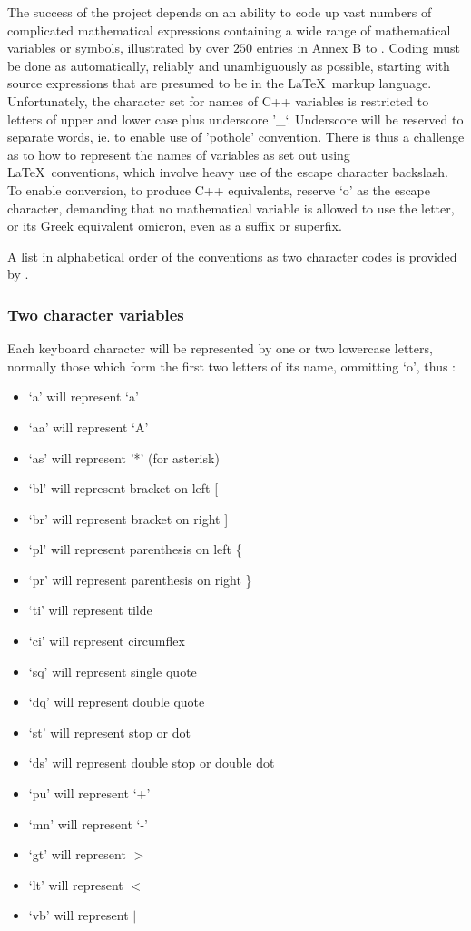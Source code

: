 The success of the project depends on an ability to code up vast numbers
of complicated mathematical expressions containing a wide range of
mathematical variables or symbols, illustrated by over $250$ entries
in Annex B to \cite{pappeqs3}. Coding must be done as automatically, reliably
and unambiguously as possible, starting with source expressions that are
presumed to be in the \LaTeX \ markup language. Unfortunately, the
character set for names of C++ variables is restricted to letters of
upper and lower case plus underscore '\_`. Underscore will be reserved
to separate words, ie. to enable use of 'pothole' convention. There is
thus a challenge as to how to represent the names of variables as set
out using \LaTeX \ conventions, which involve heavy use of the escape
character backslash. To enable conversion, to produce C++ equivalents,
reserve `o' as the escape character, demanding that no mathematical
variable is allowed to use the letter, or its Greek equivalent omicron,
even as a suffix or superfix.

A list in alphabetical order of the conventions as two character codes
is provided by .

\subsubsection{Two character variables}\label{sec:two-character-variables}

Each keyboard character will be represented by one or two lowercase
letters, normally those which form the first two letters of its name,
ommitting `o', thus :

\begin{itemize}
\item `a' will represent `a'
\item `aa' will represent `A'
\item `as' will represent '*' (for asterisk)
\item `bl' will represent bracket on left {[}
\item `br' will represent bracket on right {]}
\item `pl' will represent parenthesis on left \{
\item `pr' will represent parenthesis on right \}
\item `ti' will represent tilde
\item `ci' will represent circumflex
\item `sq' will represent single quote
\item `dq' will represent double quote
\item `st' will represent stop or dot
\item `ds' will represent double stop or double dot
\item `pu' will represent `+'
\item `mn' will represent `-'
\item `gt' will represent $>$
\item `lt' will represent $<$
\item `vb' will represent $|$
\end{itemize}

